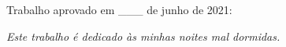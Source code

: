 \documentclass[	12pt, Times, openright, twoside, a4paper, english, brazil]{abntex2}
\begin{document}
%
% 
%
\begin{folhadeaprovacao}
  \begin{center}
    {\ABNTEXchapterfont\large\imprimirautor}

    \vspace*{\fill}\vspace*{\fill}
    {\ABNTEXchapterfont\bfseries\Large\imprimirtitulo}
    \vspace*{\fill}
    
    \hspace{.45\textwidth}
    \begin{minipage}{.5\textwidth}
        \imprimirpreambulo
    \end{minipage}%
    \vspace*{\fill}
   \end{center}
    
   Trabalho aprovado em \_\_\_ de junho de 2021:

      
   \begin{center}
    \vspace*{0.5cm}
    {\large\imprimirlocal}
    \par
    {\large\imprimirdata}
    \vspace*{1cm}
  \end{center}
  
\end{folhadeaprovacao}

\begin{dedicatoria}
   \vspace*{\fill}
   \centering
   \noindent
   \textit{ Este trabalho é dedicado às minhas noites mal dormidas.} \vspace*{\fill}
\end{dedicatoria}
\end{document}
